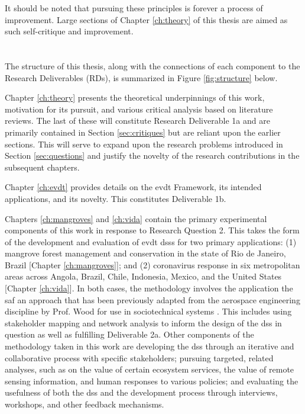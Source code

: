 It should be noted that pursuing these principles is forever a process of improvement. Large sections of Chapter \ref{ch:theory} of this thesis are aimed as such self-critique and improvement. 

\section{}

The structure of this thesis, along with the connections of each component to the Research Deliverables (RDs), is summarized in Figure \ref{fig:structure} below.

Chapter \ref{ch:theory} presents the theoretical underpinnings of this work, motivation for its pursuit, and various critical analysis based on literature reviews. The last of these will constitute Research Deliverable 1a and are primarily contained in Section \ref{sec:critiques} but are reliant upon the earlier sections. This will serve to expand upon the research problems introduced in Section \ref{sec:questions} and justify the novelty of the research contributions in the subsequent chapters. 

Chapter \ref{ch:evdt} provides details on the \ac{evdt} Framework, its intended applications, and its novelty. This constitutes Deliverable 1b. 

Chapters \ref{ch:mangroves} and \ref{ch:vida} contain the primary experimental components of this work in response to Research Question 2. This takes the form of the development and evaluation of \ac{evdt} \acp{dss} for two primary applications: (1) mangrove forest management and conservation in the state of Rio de Janeiro, Brazil [Chapter \ref{ch:mangroves}]; and (2) coronavirus response in six metropolitan areas across Angola, Brazil, Chile, Indonesia, Mexico, and the United States [Chapter \ref{ch:vida}]. In both cases, the methodology involves the application the \ac{saf} \cite{maierArtSystemsArchitecting2009, crawleySystemArchitectureStrategy2015} an approach that has been previously adapted from the aerospace engineering discipline by Prof. Wood for use in sociotechnical systems \cite{pfotenhauerArchitectingComplexInternational2016}. This includes using stakeholder mapping and network analysis to inform the design of the \ac{dss} in question as well as fulfilling Deliverable 2a. Other components of the methodology taken in this work are developing the \ac{dss} through an iterative and collaborative process with specific stakeholders; pursuing targeted, related analyses, such as on the value of certain ecosystem services, the value of remote sensing information, and human responses to various policies; and evaluating the usefulness of both the \ac{dss} and the development process through interviews, workshops, and other feedback mechanisms. 

